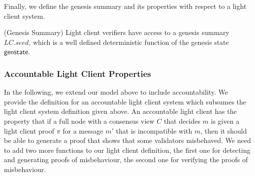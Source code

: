 \noindent Finally, we define the genesis summary and its properties with respect to a light client system. 

\begin{definition}(Genesis Summary) 
\label{def:genesis_summary} Light client verifiers have access to a genesis summary $\mathit{LC.seed}$, 
which is a well defined deterministic function of the genesis state $\mathsf{genstate}$.
\end{definition}

\subsubsection{Accountable Light Client Properties}
\label{sec:accountability}

In the following, we extend our model above to include accountability. We provide the definition for an accountable light client system which subsumes the light client system definition given above.
An accountable light client has the property that if a full node with a consensus view $C$ that decides $m$ is given a light client proof $\pi$ for a message $m'$ that is incompatible with $m$, then 
it should be able to generate a proof that shows that some validators misbehaved. We need to add two more functions to our light client definition, the first one for detecting and generating proofs of 
misbehaviour, the second one for verifying the proofs of misbehaviour.

